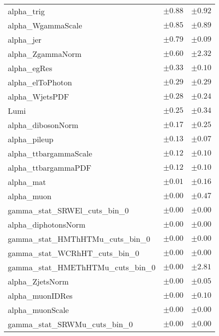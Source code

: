 \begin{table}
\begin{center}
\begin{tabular*}{\textwidth}{@{\extracolsep{\fill}}lcc}
alpha\_trig         & $\pm 0.88$          & $\pm 0.92$       \\
alpha\_WgammaScale         & $\pm 0.85$          & $\pm 0.89$       \\
alpha\_jer         & $\pm 0.79$          & $\pm 0.09$       \\
alpha\_ZgammaNorm         & $\pm 0.60$          & $\pm 2.32$       \\
alpha\_egRes         & $\pm 0.33$          & $\pm 0.10$       \\
alpha\_elToPhoton         & $\pm 0.29$          & $\pm 0.29$       \\
alpha\_WjetsPDF         & $\pm 0.28$          & $\pm 0.24$       \\
Lumi         & $\pm 0.25$          & $\pm 0.34$       \\
alpha\_dibosonNorm         & $\pm 0.17$          & $\pm 0.25$       \\
alpha\_pileup         & $\pm 0.13$          & $\pm 0.07$       \\
alpha\_ttbargammaScale         & $\pm 0.12$          & $\pm 0.10$       \\
alpha\_ttbargammaPDF         & $\pm 0.12$          & $\pm 0.10$       \\
alpha\_mat         & $\pm 0.01$          & $\pm 0.16$       \\
alpha\_muon         & $\pm 0.00$          & $\pm 0.47$       \\
gamma\_stat\_SRWEl\_cuts\_bin\_0         & $\pm 0.00$          & $\pm 0.00$       \\
alpha\_diphotonsNorm         & $\pm 0.00$          & $\pm 0.00$       \\
gamma\_stat\_HMThHTMu\_cuts\_bin\_0         & $\pm 0.00$          & $\pm 0.00$       \\
gamma\_stat\_WCRhHT\_cuts\_bin\_0         & $\pm 0.00$          & $\pm 0.00$       \\
gamma\_stat\_HMEThHTMu\_cuts\_bin\_0         & $\pm 0.00$          & $\pm 2.81$       \\
alpha\_ZjetsNorm         & $\pm 0.00$          & $\pm 0.05$       \\
alpha\_muonIDRes         & $\pm 0.00$          & $\pm 0.10$       \\
alpha\_muonScale         & $\pm 0.00$          & $\pm 0.00$       \\
gamma\_stat\_SRWMu\_cuts\_bin\_0         & $\pm 0.00$          & $\pm 0.00$       \\

\end{tabular*}
\end{center}
\end{table}
